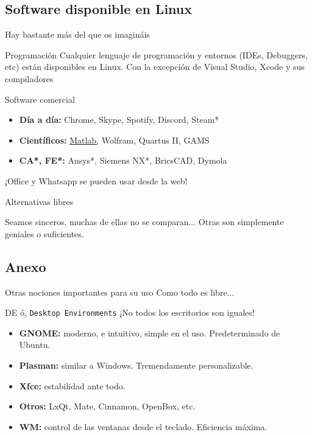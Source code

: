 \documentclass[12pt]{beamer}
\begin{document}
\subsection{Software disponible en Linux}

\begin{frame}{Hay bastante más del que os imagináis}
	\begin{block}{Programación}
		Cualquier lenguaje de programación y entornos (IDEs, Debuggers, etc) están disponibles en Linux. Con la excepción de Visual Studio, Xcode y sus compiladores
	\end{block}
	\begin{block}{Software comercial}
		\begin{itemize}
			\item \textbf{Día a día:} Chrome, Skype, Spotify, Discord, Steam*
			\item \textbf{Científicos:} \underline{Matlab,} Wolfram, Quartus II, GAMS 
			\item \textbf{CA*, FE*:} Ansys*, Siemens NX*, BricsCAD, Dymola
		\end{itemize}		 		
	\end{block}
	¡Office y Whatsapp se pueden usar desde la web!
\end{frame}

\begin{frame}{Alternativas libres}
	\begin{center}
		Seamos sinceros, muchas de ellas no se comparan... Otras son simplemente geniales o suficientes.
	\end{center}
\end{frame}

\subsection{Anexo}
\begin{frame}{Otras nociones importantes para su uso}
	Como todo es libre...
	\begin{block}{DE ó, \texttt{Desktop Environments}}
		¡No todos los escritorios son iguales!
		\begin{itemize}
			\item \textbf{GNOME:}  moderno, e intuitivo, simple en el uso. Predeterminado de Ubuntu.
			\item \textbf{Plasman:} similar a Windows. Tremendamente personalizable.
			\item \textbf{Xfce:} estabilidad ante todo.
			\item \textbf{Otros:} LxQt, Mate, Cinnamon, OpenBox, etc.
			\item \textbf{WM:} control de las ventanas desde el teclado. Eficiencia máxima.
		\end{itemize}
	\end{block}
\end{frame}
\end{document}
